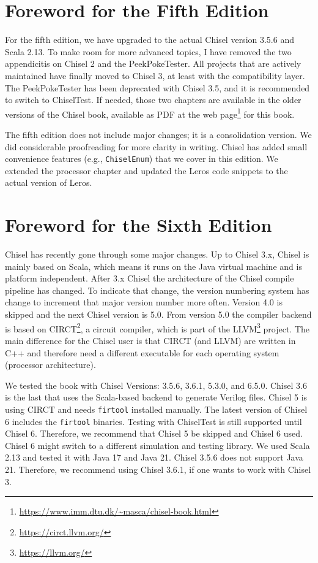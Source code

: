 \documentclass[%
    10pt,
    headinclude, footexclude,
    openright, %
    notitlepage,
    cleardoubleempty,
    headsepline,
    pointlessnumbers,
    bibtotoc, idxtotoc,
    ]{scrbook}
\newcommand{\code}[1]{{\lstinline[basicstyle=\small\ttfamily]{#1}}}
\newcommand{\myref}[2]{\href{#1}{#2}}
\renewcommand{\myref}[2]{{#2}{\footnote{\url{#1}}}}
\begin{document}
\section*{Foreword for the Fifth Edition}

For the fifth edition, we have upgraded to the actual Chisel version 3.5.6 and Scala 2.13.
To make room for more advanced topics, I have removed the two appendicitis on
Chisel 2 and the PeekPokeTester. All projects that are actively maintained have finally
moved to Chisel 3, at least with the compatibility layer. The PeekPokeTester has been
deprecated with Chisel 3.5, and it is recommended to switch to ChiselTest.
If needed, those two chapters are available in the older versions of the Chisel book,
available as PDF at the \myref{https://www.imm.dtu.dk/~masca/chisel-book.html}{web page} for this book.

The fifth edition does not include major changes; it is a consolidation version.
We did considerable proofreading for more clarity in writing. Chisel has added small convenience
features (e.g., \code{ChiselEnum}) that we cover in this edition.
We extended the processor chapter and updated the Leros code snippets
to the actual version of Leros.


\section*{Foreword for the Sixth Edition}


Chisel has recently gone through some major changes. Up to Chisel 3.x, Chisel is mainly
based on Scala, which means it runs on the Java virtual machine and is platform independent.
After 3.x Chisel the architecture of the Chisel compile pipeline has changed. To indicate that change,
the version numbering system has change to increment that major version number more often.
Version 4.0 is skipped and the next Chisel version is 5.0.
From version 5.0 the compiler backend is based on \myref{https://circt.llvm.org/}{CIRCT},
a circuit compiler, which is part of the \myref{https://llvm.org/}{LLVM} project.
The main difference for the Chisel user is that CIRCT (and LLVM) are written in C++
and therefore need a different executable for each operating system (processor
architecture).


We tested the book with Chisel Versions: 3.5.6, 3.6.1, 5.3.0, and 6.5.0.
Chisel 3.6 is the last that uses the Scala-based backend to generate Verilog files.
Chisel 5 is using CIRCT and needs \code{firtool} installed manually.
The latest version of Chisel 6 includes the \code{firtool} binaries.
Testing with ChiselTest is still supported until Chisel 6.
Therefore, we recommend that Chisel 5 be skipped and Chisel 6 used.
Chisel 6 might switch to a different simulation and testing library.
We used Scala 2.13 and tested it with Java 17 and Java 21.
Chisel 3.5.6 does not support Java 21. Therefore, we recommend using Chisel
3.6.1, if one wants to work with Chisel 3.
\end{document}
